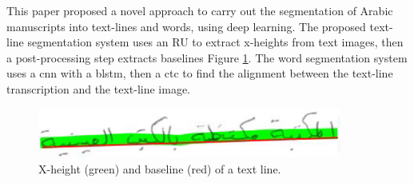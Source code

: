 This paper \cite{8892920} proposed a novel approach to carry out the segmentation of Arabic manuscripts into text-lines and words, using deep learning. The proposed text-line segmentation system uses an \acrshort{RU} to extract x-heights from text images, then a post-processing step extracts baselines Figure \ref{fig:X-height}. The word segmentation system uses a \acrshort{cnn} with a \acrshort{blstm}, then a \acrshort{ctc} to find the alignment between the text-line transcription and the text-line image.

\begin{figure}[!htb]
    \centering
    \includegraphics[width=10cm]{images/X-height.png}
    \caption{X-height (green) and baseline (red) of a text line.}
    \label{fig:X-height}
\end{figure}

